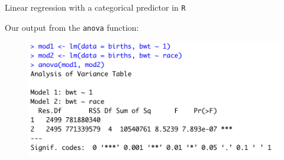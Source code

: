 \documentclass[10pt,t]{beamer}
\begin{document}
\begin{frame}{Linear regression with a categorical predictor in \texttt{R}}

\vspace{-5 mm}

Our output from the \texttt{anova} function:

\vspace{0.15cm}

\begin{figure}
	\centering \includegraphics[scale=0.5]{figures/anova_race.png}
\end{figure}

\end{frame}
\end{document}
